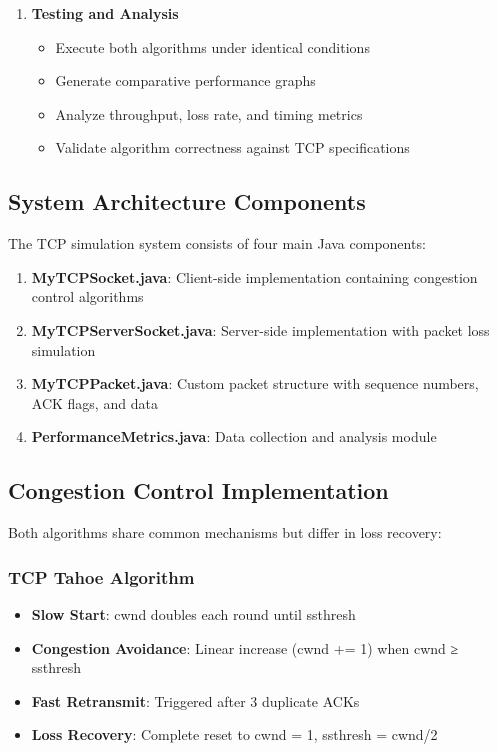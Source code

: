\documentclass[12pt]{article}
\begin{document}
\begin{enumerate}
    \item \textbf{Testing and Analysis}
    \begin{itemize}
        \item Execute both algorithms under identical conditions
        \item Generate comparative performance graphs
        \item Analyze throughput, loss rate, and timing metrics
        \item Validate algorithm correctness against TCP specifications
    \end{itemize}
\end{enumerate}

\subsection{System Architecture Components}

The TCP simulation system consists of four main Java components:

\begin{enumerate}
    \item \textbf{MyTCPSocket.java}: Client-side implementation containing congestion control algorithms
    \item \textbf{MyTCPServerSocket.java}: Server-side implementation with packet loss simulation
    \item \textbf{MyTCPPacket.java}: Custom packet structure with sequence numbers, ACK flags, and data
    \item \textbf{PerformanceMetrics.java}: Data collection and analysis module
\end{enumerate}

\subsection{Congestion Control Implementation}

Both algorithms share common mechanisms but differ in loss recovery:

\subsubsection{TCP Tahoe Algorithm}
\begin{itemize}
    \item \textbf{Slow Start}: cwnd doubles each round until ssthresh
    \item \textbf{Congestion Avoidance}: Linear increase (cwnd += 1) when cwnd ≥ ssthresh
    \item \textbf{Fast Retransmit}: Triggered after 3 duplicate ACKs
    \item \textbf{Loss Recovery}: Complete reset to cwnd = 1, ssthresh = cwnd/2
\end{itemize}
\end{document}
